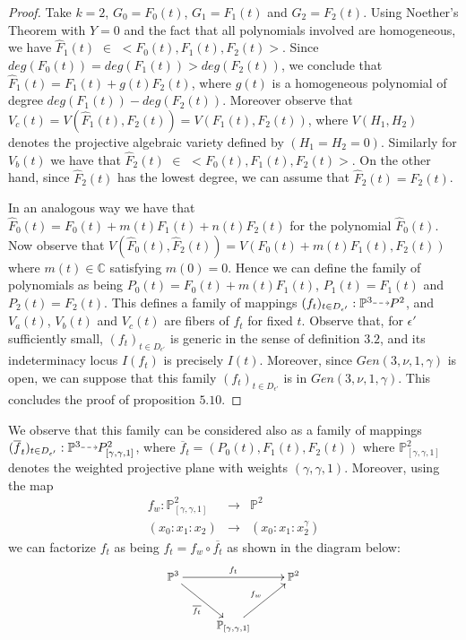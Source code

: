 \documentclass{amsart}
\theoremstyle{definition}
\theoremstyle{proposition}
\numberwithin{equation}{section}
\theoremstyle{main}
\begin{document}
\begin{proof}
Take $k=2$, $G_{0}=F_{0}(t)$, $G_{1}=F_{1}(t)$ and $G_{2}=F_{2}(t)$. Using Noether's Theorem with $Y=0$ and the fact that all polynomials involved are homogeneous, we have $\hat F_{1}(t)$ $\in$ $<F_{0}(t),F_{1}(t),F_{2}(t)>$. Since $deg(F_{0}(t))=deg(F_{1}(t))>deg(F_{2}(t))$, we conclude that $\hat F_{1}(t)=F_{1}(t)+g(t)F_{2}(t)$, where $g(t)$ is a homogeneous polynomial of degree $deg(F_{1}(t))-deg(F_{2}(t))$. Moreover observe that $V_{c}(t)=V(\hat F_{1}(t),F_{2}(t))=V(F_{1}(t),F_{2}(t))$, where $V(H_{1},H_{2})$ denotes the projective algebraic variety defined by $(H_{1}=H_{2}=0)$. Similarly for $V_{b}(t)$ we have that $\hat F_{2}(t)$ $\in$ $<F_{0}(t),F_{1}(t),F_{2}(t)>$.  On the other hand, since $\hat F_{2}(t)$ has the lowest degree, we can assume that $\hat F_{2}(t)=F_{2}(t)$.
   
In an analogous way we have that $\hat F_{0}(t)=F_{0}(t)+m(t)F_{1}(t)+n(t)F_{2}(t)$ for the polynomial $\hat F_{0}(t)$. Now observe that $V(\hat F_{0}(t),\hat F_{2}(t))=V(F_{0}(t)+m(t)F_{1}(t),F_{2}(t))$ where $m(t)\in \mathbb C$ satisfying $m(0)=0$. Hence we can define the family of polynomials as being $P_{0}(t)=F_{0}(t)+m(t)F_{1}(t)$, $P_{1}(t)=F_{1}(t)$ and $P_{2}(t)=F_{2}(t) $. This defines a  family of mappings $({f}_{t})_{t \in D_{\epsilon'}}:\mathbb P^{3} {\mathbin{\tikz [baseline=-0.25ex,-latex, dashed,->,densely dashed    ] \draw [->,densely dashed    ] (0pt,
0.5ex) -- (1.3em,0.5ex);}} P^{2}$, and $V_{a}(t)$, $V_{b}(t)$ and $V_{c}(t)$ are fibers of ${f}_{t}$ for fixed $t$. Observe that, for ${\epsilon'}$ sufficiently small, $({f}_{t})_{t \in D_{\epsilon'}}$ is generic in the sense of definition $3.2$, and its indeterminacy locus $I({f}_{t})$ is precisely $I(t).$ Moreover, since $Gen(3,\nu,1,\gamma)$ is open, we can suppose that this family $({f}_{t})_{t \in D_{\epsilon'}}$ is in $Gen\left(3,\nu,1,\gamma\right)$. This concludes the proof of proposition $5.10$. 
\end{proof}
\label{fbarra} We observe that this family can be considered also as a family of mappings $(\overline{f}_{t})_{t \in D_{\epsilon'}}:\mathbb P^{3} {\mathbin{\tikz [baseline=-0.25ex,-latex, dashed,->,densely dashed    ] \draw [->,densely dashed    ] (0pt,
0.5ex) -- (1.3em,0.5ex);}} P_{[\gamma,\gamma,1]}^2$, where $\overline{f}_{t}=(P_{0}(t),F_{1}(t),F_{2}(t))$ where $\mathbb P_{[\gamma,\gamma,1]}^2$ denotes the weighted projective plane with weights $(\gamma,\gamma,1)$. Moreover, using the map \begin{eqnarray*}
{f_w} : \mathbb P_{[\gamma,\gamma,1]}^2&\to& \mathbb P^2\\
         (x_{0}: x_{1}:x_{2})&\to& (x_{0}: x_{1}: x_{2}^{\gamma})
\end{eqnarray*}
we can factorize $f_{t}$ as being $f_{t}=f_{w}\circ \overline {f_{t}}$ as shown in the diagram below:
$$\small{\xymatrix{
  \mathbb{P}^3 \ar[rr]^{f_{t}} \ar[dr]_{\overline{f_{t}}} && \mathbb{P}^2 \\
  & {\mathbb  P_{[\gamma,\gamma,1]}}\ar[ur]^{f_{w}} }}$$
\end{document}
